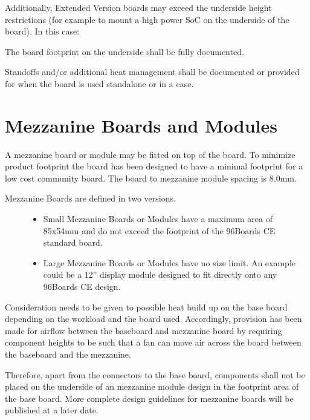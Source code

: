 \documentclass[a4paper,10pt,oneside,english]{sphinxmanual}
\begin{document}
\noindent{}

\noindent{}

\sphinxAtStartPar
Additionally, Extended Version boards may exceed the underside height restrictions (for example to mount a high power SoC on the underside of the board). In this case:

\sphinxAtStartPar
The board footprint on the underside shall be fully documented.

\sphinxAtStartPar
Standoffs and/or additional heat management shall be documented or provided for when the board is used standalone or in a case.


\chapter{Mezzanine Boards and Modules}
\label{\detokenize{chapter1-ce:mezzanine-boards-and-modules}}
\sphinxAtStartPar
A mezzanine board or module may be fitted on top of the board. To minimize product footprint the board has been designed to have a minimal footprint for a low cost community board. The board to mezzanine module spacing is 8.0mm.
\begin{description}
\item[{Mezzanine Boards are defined in two versions.}] \leavevmode\begin{itemize}
\item {} 
\sphinxAtStartPar
Small Mezzanine Boards or Modules have a maximum area of 85x54mm and do not exceed the footprint of the 96Boards CE standard board.

\item {} 
\sphinxAtStartPar
Large Mezzanine Boards or Modules have no size limit. An example could be a 12” display module designed to fit directly onto any 96Boards CE design.

\end{itemize}

\end{description}

\sphinxAtStartPar
Consideration needs to be given to possible heat build up on the base board depending on the workload and the board used. Accordingly, provision has been made for airflow between the baseboard and mezzanine board by requiring component heights to be such that a fan can move air across the board between the baseboard and the mezzanine.

\sphinxAtStartPar
Therefore, apart from the connectors to the base board, components shall not be placed on the underside of an mezzanine module design in the footprint area of the base board. More complete design guidelines for mezzanine boards will be published at a later date.



\renewcommand{\indexname}{Index}
\printindex
\end{document}
